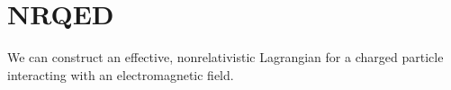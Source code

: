 \chapter{NRQED}




We can construct an effective, nonrelativistic Lagrangian for a charged particle interacting with an electromagnetic field.

%



